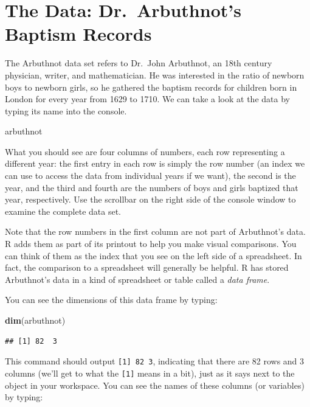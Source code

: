 \documentclass[]{book}
\newenvironment{Shaded}{\begin{snugshade}}{\end{snugshade}}
\newcommand{\KeywordTok}[1]{\textcolor[rgb]{0.13,0.29,0.53}{\textbf{#1}}}
\newcommand{\NormalTok}[1]{#1}
\theoremstyle{definition}
\theoremstyle{definition}
\theoremstyle{definition}
\theoremstyle{remark}
\begin{document}
\section{The Data: Dr.~Arbuthnot's Baptism
Records}\label{the-data-dr.arbuthnots-baptism-records}

The Arbuthnot data set refers to Dr.~John Arbuthnot, an 18th century
physician, writer, and mathematician. He was interested in the ratio of
newborn boys to newborn girls, so he gathered the baptism records for
children born in London for every year from 1629 to 1710. We can take a
look at the data by typing its name into the console.

\begin{Shaded}
\begin{Highlighting}[]
\NormalTok{arbuthnot}
\end{Highlighting}
\end{Shaded}

What you should see are four columns of numbers, each row representing a
different year: the first entry in each row is simply the row number (an
index we can use to access the data from individual years if we want),
the second is the year, and the third and fourth are the numbers of boys
and girls baptized that year, respectively. Use the scrollbar on the
right side of the console window to examine the complete data set.

Note that the row numbers in the first column are not part of
Arbuthnot's data. R adds them as part of its printout to help you make
visual comparisons. You can think of them as the index that you see on
the left side of a spreadsheet. In fact, the comparison to a spreadsheet
will generally be helpful. R has stored Arbuthnot's data in a kind of
spreadsheet or table called a \emph{data frame}.

You can see the dimensions of this data frame by typing:

\begin{Shaded}
\begin{Highlighting}[]
\KeywordTok{dim}\NormalTok{(arbuthnot)}
\end{Highlighting}
\end{Shaded}

\begin{verbatim}
## [1] 82  3
\end{verbatim}

This command should output \texttt{{[}1{]}\ 82\ 3}, indicating that
there are 82 rows and 3 columns (we'll get to what the \texttt{{[}1{]}}
means in a bit), just as it says next to the object in your workspace.
You can see the names of these columns (or variables) by typing:
\end{document}
